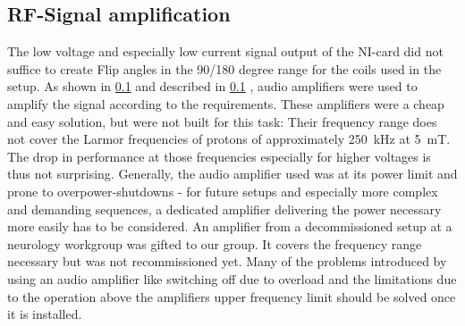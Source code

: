         \subsection{RF-Signal amplification}
        The low voltage and especially low current signal output of the NI-card did not suffice to create Flip angles in the 90/180 degree range for the coils used in the setup. As shown in \ref{} and described in \ref{}%
        , audio amplifiers were used to amplify the signal according to the requirements. These amplifiers were a cheap and easy solution, but were not built for this task: Their frequency range does not cover the Larmor frequencies of protons of approximately \SI{250}{\kilo\hertz} at \SI{5}{\milli\tesla}. The drop in performance at those frequencies especially for higher voltages is thus not surprising. Generally, the audio amplifier used was at its power limit and prone to overpower-shutdowns - for future setups and especially more complex and demanding sequences, a dedicated amplifier delivering the power necessary more easily has to be considered.
            An amplifier from a decommissioned setup at a neurology workgroup was gifted to our group. It covers the frequency range necessary but was not recommissioned yet. Many of the problems introduced by using an audio amplifier like switching off due to overload and the limitations due to the operation above the amplifiers upper frequency limit should be solved once it is installed.
